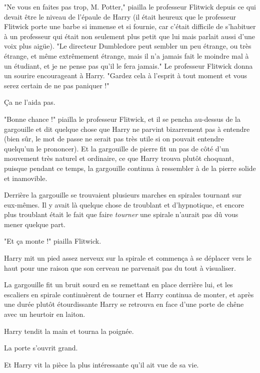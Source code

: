 "Ne vous en faites pas trop, M. Potter," piailla le professeur Flitwick depuis ce qui devait être le niveau de l'épaule de Harry (il était heureux que le professeur Flitwick porte une barbe si immense et si fournie, car c'était difficile de s'habituer à un professeur qui était non seulement plus petit que lui mais parlait aussi d'une voix plus aigüe). "Le directeur Dumbledore peut sembler un peu étrange, ou très étrange, et même extrêmement étrange, mais il n'a jamais fait le moindre mal à un étudiant, et je ne pense pas qu'il le fera jamais." Le professeur Flitwick donna un sourire encourageant à Harry. "Gardez cela à l'esprit à tout moment et vous serez certain de ne pas paniquer !"

Ça ne l'aida pas.

"Bonne chance !" piailla le professeur Flitwick, et il se pencha au-dessus de la gargouille et dit quelque chose que Harry ne parvint bizarrement pas à entendre (bien sûr, le mot de passe ne serait pas très utile si on pouvait entendre quelqu'un le prononcer). Et la gargouille de pierre fit un pas de côté d'un mouvement très naturel et ordinaire, ce que Harry trouva plutôt choquant, puisque pendant ce temps, la gargouille continua à ressembler à de la pierre solide et inamovible.

Derrière la gargouille se trouvaient plusieurs marches en spirales tournant sur eux-mêmes. Il y avait là quelque chose de troublant et d'hypnotique, et encore plus troublant était le fait que faire \emph{tourner}  une spirale n'aurait pas dû vous mener quelque part.

"Et ça monte !" piailla Flitwick.

Harry mit un pied assez nerveux sur la spirale et commença à se déplacer vers le haut pour une raison que son cerveau ne parvenait pas du tout à visualiser.

La gargouille fit un bruit sourd en se remettant en place derrière lui, et les escaliers en spirale continuèrent de tourner et Harry continua de monter, et après une durée plutôt étourdissante Harry se retrouva en face d'une porte de chêne avec un heurtoir en laiton.

Harry tendit la main et tourna la poignée.

La porte s'ouvrit grand.

Et Harry vit la pièce la plus intéressante qu'il ait vue de sa vie.

